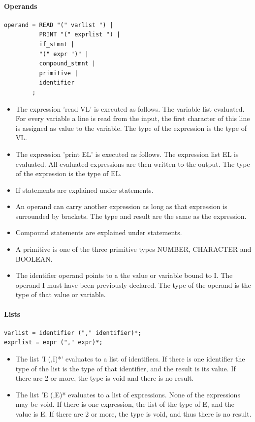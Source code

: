 \documentclass[paper=a4, fontsize=11pt]{article}
\numberwithin{equation}{section}		%
\numberwithin{figure}{section}			%
\numberwithin{table}{section}				%
\begin{document}
\paragraph{Operands}
\begin{verbatim}
operand = READ "(" varlist ") |
	   	  PRINT "(" exprlist ") |
	   	  if_stmnt |
	   	  "(" expr ")" |
	   	  compound_stmnt |
	   	  primitive |
		  identifier
		;
\end{verbatim}

\begin{itemize}
\item The expression 'read VL' is executed as follows. The variable list evaluated. For every variable a line is read from the input, the first character of this line is assigned as value to the variable. The type of the expression is the type of VL.
\item The expression 'print EL' is executed as follows. The expression list EL is evaluated. All evaluated expressions are then written to the output. The type of the expression is the type of EL.
\item If statements are explained under statements.
\item An operand can carry another expression as long as that expression is surrounded by brackets. The type and result are the same as the expression.
\item Compound statements are explained under statements.
\item A primitive is one of the three primitive types NUMBER, CHARACTER and BOOLEAN.
\item The identifier operand points to a the value or variable bound to I. The operand I must have been previously declared. The type of the operand is the type of that value or variable.
\end{itemize}

\paragraph{Lists}
\begin{verbatim}
varlist = identifier ("," identifier)*;
exprlist = expr ("," expr)*;
\end{verbatim}
\begin{itemize}
\item The list 'I (,I)*' evaluates to a list of identifiers. If there is one identifier the type of the list is the type of that identifier, and the result is its value. If there are 2 or more, the type is void and there is no result.
\item The list 'E (,E)* evaluates to a list of expressions. None of the expressions may be void. If there is one expression, the list of the type of E, and the value is E. If there are 2 or more, the type is void, and thus there is no result.
\end{itemize}
\end{document}
